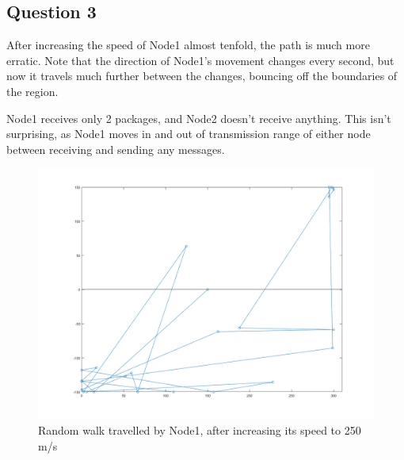 \documentclass[11pt,journal]{article}
\begin{document}
	\pagebreak
	\subsection{Question 3}
	After increasing the speed of Node1 almost tenfold, the path is much more erratic. Note that the direction of Node1's movement changes every second, but now it travels much further between the changes, bouncing off the boundaries of the region.
	
	Node1 receives only 2 packages, and Node2 doesn't receive anything. This isn't surprising, as Node1 moves in and out of transmission range of either node between receiving and sending any messages.
	
	\begin{figure}[h]
		\centering
		\includegraphics[scale=0.5]{lab4ii_walk_matlab2.png}
		\caption{Random walk travelled by Node1, after increasing its speed to 250 m/s}
	\end{figure}
	
	

	
\end{document}
